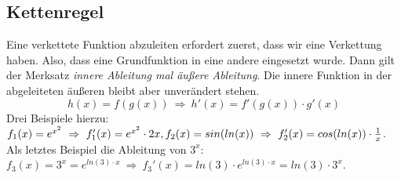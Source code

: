 \subsection{Kettenregel}
Eine verkettete Funktion abzuleiten erfordert zuerst, dass wir eine Verkettung haben. Also, dass eine Grundfunktion in eine andere eingesetzt wurde. Dann gilt der Merksatz \emph{innere Ableitung mal äußere Ableitung}. Die innere Funktion in der abgeleiteten äußeren bleibt aber unverändert stehen.
\[h(x)=f(g(x))\ \Rightarrow\ h'(x)=f'(g(x))\cdot g'(x)\]
Drei Beispiele hierzu: \(f_1(x)=e^{x^2}\ \Rightarrow\ f_1'(x)=e^{x^2}\cdot 2x,\\
f_2(x)=sin(ln(x))\ \Rightarrow\ f_2'(x)=cos(ln(x))\cdot \frac{1}{x}\).\\
Als letztes Beispiel die Ableitung von \(3^x\): \(f_3(x)=3^x=e^{ln(3)\cdot x}\ \Rightarrow\ f_3'(x)=ln(3)\cdot e^{ln(3)\cdot x}=ln(3)\cdot 3^x\).
